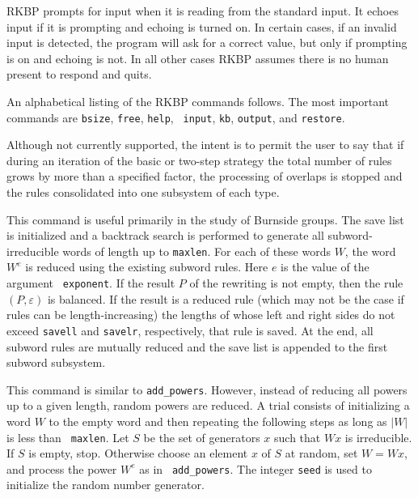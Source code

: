 RKBP prompts for input when it is reading from the standard input.  It
echoes input if it is prompting and echoing is turned on.  In certain
cases, if an invalid input is detected, the program will ask for a
correct value, but only if prompting is on and echoing is not.  In all
other cases RKBP assumes there is no human present to respond and
quits.

An alphabetical listing of the RKBP commands follows.  The most
important commands are {\tt bsize}, {\tt free}, {\tt help}, {\tt
input}, {\tt kb}, {\tt output}, and {\tt restore}.

\medskip
{}

\nobreak

Although not currently supported, the intent is to permit the user to
say that if during an iteration of the basic or two-step strategy the
total number of rules grows by more than a specified factor, the
processing of overlaps is stopped and the rules consolidated into one
subsystem of each type.

\medskip
{}

\nobreak

This command is useful primarily in the study of Burnside groups.  The
save list is initialized and a backtrack search is performed to
generate all subword-irreducible words of length up to {\tt maxlen}.
For each of these words $W$, the word $W^e$ is reduced using the
existing subword rules.  Here $e$ is the value of the argument {\tt
exponent}.  If the result $P$ of the rewriting is not empty, then the
rule $(P,\varepsilon)$ is balanced.  If the result is a reduced rule
(which may not be the case if rules can be length-increasing) the
lengths of whose left and right sides do not exceed {\tt savell} and
{\tt savelr}, respectively, that rule is saved.  At the end, all
subword rules are mutually reduced and the save list is appended to
the first subword subsystem.

\medskip
{}

\nobreak

This command is similar to {\tt add\_powers}.  However, instead of
reducing all powers up to a given length, random powers are reduced.
A trial consists of initializing a word $W$ to the empty word and then
repeating the following steps as long as $|W|$ is less than {\tt
maxlen}.  Let $S$ be the set of generators $x$ such that $Wx$ is
irreducible.  If $S$ is empty, stop.  Otherwise choose an element $x$
of $S$ at random, set $W = Wx$, and process the power $W^e$ as in {\tt
add\_powers}.  The integer {\tt seed} is used to initialize the random
number generator.

